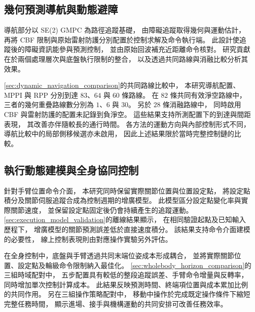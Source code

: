 \subsection{幾何預測導航與動態避障}
\label{subsec:conclusion_geometric_navigation}

導航部分以 SE(2) GMPC 為路徑追蹤基礎，
由障礙追蹤取得幾何與運動估計，
再將 CBF 限制與原始雷射防護分別配置於控制求解及命令執行端。
此設計使追蹤後的障礙資訊能參與預測控制，
並由原始回波補充近距離命令核對。
研究貢獻在於兩個處理層次與底盤執行限制的整合，
以及透過共同路線與消融比較分析其效果。

\cref{sec:dynamic_navigation_comparison}的共同路線比較中，
本研究導航配置、MPPI 與 RPP 分別到達 $83$、$64$ 與 $60$ 條路線。
在 $82$ 條共同有效淨空路線中，
三者的幾何重疊路線數分別為 $1$、$6$ 與 $30$。
另於 $28$ 條消融路線中，
同時啟用 CBF 與雷射防護的配置未記錄到負淨空。
這些結果支持所測配置下的到達與間距表現，
其改善亦伴隨較長的通行時間。
各方法的運動方向與內部控制形式不同，
導航比較中的局部側移候選亦未啟用，
因此上述結果限於當時完整控制鏈的比較。

\subsection{執行動態建模與全身協同控制}
\label{subsec:conclusion_execution_wholebody_control}

針對手臂位置命令介面，
本研究同時保留實際關節位置與位置設定點，
將設定點積分及關節伺服追蹤合成為控制週期的增廣模型。
此模型區分設定點變化率與實際關節速度，
並保留設定點固定後仍會持續產生的追蹤運動。
\cref{sec:execution_model_validation}的離線結果顯示，
在相同驗證起點及已知輸入歷程下，
增廣模型的關節預測誤差低於直接速度積分。
該結果支持命令介面建模的必要性，
線上控制表現則由對應操作實驗另外評估。

在全身控制中，底盤與手臂透過共同末端位姿成本形成耦合，
並將實際關節位置、設定點及輪級命令限制納入最佳化。
\cref{sec:wholebody_horizon_comparison}的三組時域配對中，
五步配置具有較低的整段追蹤誤差、手臂命令增量與反轉率，
同時增加單次控制計算成本。
此結果反映預測時間、終端項位置與成本累加比例的共同作用。
另在三組操作策略配對中，
移動中操作於完成既定操作條件下縮短完整任務時間，
顯示進場、接手與機構運動的共同安排可改善任務效率。

